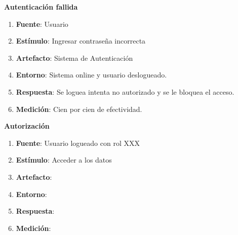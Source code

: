 \textbf{Autenticación fallida}
\begin{enumerate}
\item {\bf Fuente}: Usuario
\item {\bf Estímulo}: Ingresar contraseña incorrecta
\item {\bf Artefacto}: Sistema de Autenticación
\item {\bf Entorno}: Sistema online y usuario deslogueado. 
\item {\bf Respuesta}: Se loguea intenta no autorizado y se le bloquea el acceso. 
\item {\bf Medición}: Cien por cien de efectividad.
\end{enumerate}

{\bf Autorización}
\begin{enumerate}
\item {\bf Fuente}: Usuario logueado con rol XXX
\item {\bf Estímulo}: Acceder a los datos 
\item {\bf Artefacto}:  
\item {\bf Entorno}: 
\item {\bf Respuesta}: 
\item {\bf Medición}: 
\end{enumerate}
